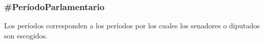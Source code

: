 \subsubsection{\#PeríodoParlamentario}

Los períodos corresponden a los períodos por los cuales los senadores
o diputados son escogidos.

\begin{description}
  
\end{description}